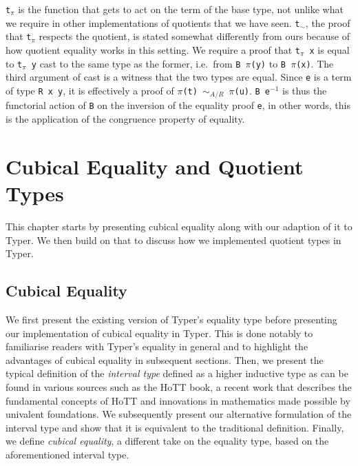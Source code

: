 \documentclass[12pt,twoside,maitrise]{dms}
\theoremstyle{definition}
\numberwithin{equation}{section}
\numberwithin{table}{chapter}
\numberwithin{figure}{chapter}
\newcommand\kw[1] {\textsf{#1}}
\newcommand\id[1] {\texttt{#1}}
\newcommand\fn[1] {\texttt{#1}}
\begin{document}
\id{t$_\pi$} is the function that gets to act on the term of the base type, not
unlike what we require in other implementations of quotients that we have seen.
\id{t$_\sim$}, the proof that \id{t$_\pi$} respects the quotient, is stated
somewhat differently from ours because of how quotient equality works in this
setting. We require a proof that \fn{t$_\pi$ x} is equal to \fn{t$_\pi$ y} cast
to the same type as the former, i.e.\ from \fn{B $\pi$(y)} to \fn{B $\pi$(x)}.
The third argument of \kw{cast} is a witness that the two types are equal. Since
\id{e} is a term of type \fn{R x y}, it is effectively a proof of \fn{$\pi$(t)
  $\sim_{A/R}$ $\pi$(u)}. \fn{B e$^{-1}$} is thus the functorial action of
\id{B} on the inversion of the equality proof \id{e}, in other words, this is
the application of the congruence property of equality.

\chapter{Cubical Equality and Quotient Types}\label{ch:cubical-equality}

This chapter starts by presenting cubical equality along with our adaption of it
to Typer. We then build on that to discuss how we implemented quotient types in
Typer.

\section{Cubical Equality}

We first present the existing version of Typer's equality type before presenting
our implementation of cubical equality in Typer. This is done notably to
familiarise readers with Typer's equality in general and to highlight the
advantages of cubical equality in subsequent sections. Then, we present the
typical definition of the \emph{interval type} defined as a higher inductive
type as can be found in various sources such as the HoTT
book\cite[Chap~6.3]{HoTTbook}, a recent work that describes the fundamental
concepts of HoTT and innovations in mathematics made possible by univalent
foundations. We subsequently present our alternative formulation of the interval
type and show that it is equivalent to the traditional definition. Finally, we
define \emph{cubical equality}, a different take on the equality type, based on
the aforementioned interval type.
\end{document}
